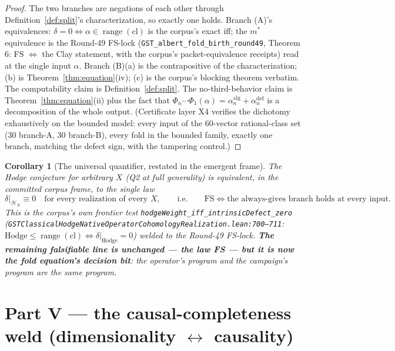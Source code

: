 \documentclass[11pt]{article}
\newtheorem{corollary}[theorem]{Corollary}
\begin{document}
\begin{proof}
The two branches are negations of each other through Definition~\ref{def:split}'s characterization, so exactly one holds. Branch (A)'s equivalences: $\delta=0\iff\alpha\in\operatorname{range}(\mathrm{cl})$ is the corpus's exact iff; the $m^*$ equivalence is the Round-49 FS-lock (\texttt{GST\_albert\_fold\_birth\_round49}, Theorem 6: FS $\iff$ the Clay statement, with the corpus's packet-equivalence receipts) read at the single input $\alpha$. Branch (B)(a) is the contrapositive of the characterization; (b) is Theorem~\ref{thm:equation}(iv); (c) is the corpus's blocking theorem verbatim. The computability claim is Definition~\ref{def:split}. The no-third-behavior claim is Theorem~\ref{thm:equation}(ii) plus the fact that $\Phi_n\cdots\Phi_1(\alpha)=\alpha^{\mathrm{alg}}_n+\alpha^{\mathrm{def}}_n$ is a decomposition of the whole output. (Certificate layer X4 verifies the dichotomy exhaustively on the bounded model: every input of the 60-vector rational-class set (30 branch-A, 30 branch-B), every fold in the bounded family, exactly one branch, matching the defect sign, with the tampering control.)
\end{proof}

\begin{corollary}[The universal quantifier, restated in the emergent frame]
\label{cor:quantifier}
The Hodge conjecture for arbitrary $X$ (Q2 at full generality) is equivalent, in the committed corpus frame, to the single law
\[
\delta\big|_{\mathcal{H}_X}\equiv 0 \quad\text{for every realization of every }X,
\qquad\text{i.e.}\qquad \mathrm{FS} \iff \text{the always-gives branch holds at every input}.
\]
This is the corpus's own frontier test \texttt{hodgeWeight\_iff\_intrinsicDefect\_zero} (\texttt{GSTClassicalHodgeNativeOperatorCohomologyRealization.lean:700--711}: $\mathrm{Hodge}\le\operatorname{range}(\mathrm{cl})\iff\delta|_{\mathrm{Hodge}}=0$) welded to the Round-49 FS-lock. \textbf{The remaining falsifiable line is unchanged — the law FS — but it is now the fold equation's decision bit}: the operator's program and the campaign's program are the same program.
\end{corollary}

\section{Part V — the causal-completeness weld (dimensionality $\leftrightarrow$ causality)}
\end{document}

